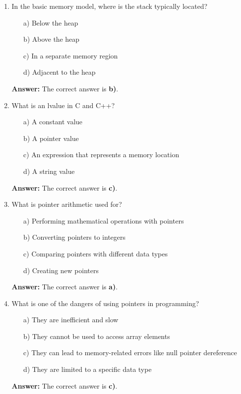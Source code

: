 \documentclass{article}
\begin{document}
\begin{enumerate}
    \item In the basic memory model, where is the stack typically located?
    \begin{enumerate}
        \item[a)] Below the heap
        \item[b)] Above the heap
        \item[c)] In a separate memory region
        \item[d)] Adjacent to the heap
    \end{enumerate}
    \textbf{Answer:} The correct answer is \textbf{b)}.

    \item What is an lvalue in C and C++?
    \begin{enumerate}
        \item[a)] A constant value
        \item[b)] A pointer value
        \item[c)] An expression that represents a memory location
        \item[d)] A string value
    \end{enumerate}
    \textbf{Answer:} The correct answer is \textbf{c)}.

    \item What is pointer arithmetic used for?
    \begin{enumerate}
        \item[a)] Performing mathematical operations with pointers
        \item[b)] Converting pointers to integers
        \item[c)] Comparing pointers with different data types
        \item[d)] Creating new pointers
    \end{enumerate}
    \textbf{Answer:} The correct answer is \textbf{a)}.

    \item What is one of the dangers of using pointers in programming?
    \begin{enumerate}
        \item[a)] They are inefficient and slow
        \item[b)] They cannot be used to access array elements
        \item[c)] They can lead to memory-related errors like null pointer dereference
        \item[d)] They are limited to a specific data type
    \end{enumerate}
    \textbf{Answer:} The correct answer is \textbf{c)}.


\end{enumerate}
\end{document}
